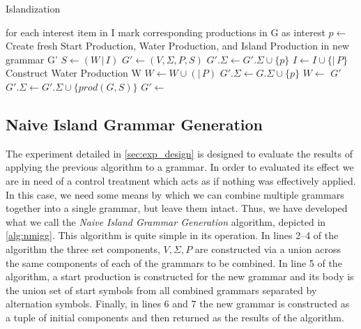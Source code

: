 \documentclass[10pt,nocc]{xrese_report}
\begin{document}
\begin{algorithm}
 \caption{Islandization}
 \begin{algorithmic}[1]
    \LineComment for each interest item in I mark corresponding productions in G as interest
      \State $p \gets$ 
      \State {}
    \EndFor
    \LineComment Create fresh Start Production, Water Production, and Island Production in new grammar G'
    \State $S \gets (W\,|\,I)$
    \State $G' \gets (V,\Sigma,P,S)$
      \State $G'.\Sigma \gets G'.\Sigma \cup \{p\}$
      \State $I \gets I \cup \{|\,P\}$
      \State {}
    \EndFor
    \LineComment Construct Water Production W
      \State $W \gets W \cup (|\,P)$
      \State $G'.\Sigma \gets G.\Sigma \cup \{p\}$
    \EndFor
    \State $W \gets$ 
    \State \Return $G'$
  \EndProcedure
  \Statex
      \State \Return
    \Else
        \State $G'.\Sigma \gets G'.\Sigma \cup \{prod(G,S)\}$
        \State {}
      \EndFor
    \EndIf
  \EndFunction
  \Statex
    \State $G' \gets$ 
    \State {}
  \EndFunction
 \end{algorithmic}

\end{algorithm}

\subsection{Naive Island Grammar Generation}

The experiment detailed in \ref{sec:exp_design} is designed to evaluate the results of applying the previous algorithm to a grammar. In order to evaluated its effect we are in need of a control treatment which acts as if nothing was effectively applied. In this case, we need some means by which we can combine multiple grammars together into a single grammar, but leave them intact. Thus, we have developed what we call the \textit{Naive Island Grammar Generation} algorithm, depicted in \ref{alg:nmigg}. This algorithm is quite simple in its operation. In lines 2--4 of the algorithm the three set components, $V,\Sigma,P$ are constructed via a union across the same components of each of the grammars to be combined. In line 5 of the algorithm, a start production is constructed for the new grammar and its body is the union set of start symbols from all combined grammars separated by alternation symbols. Finally, in lines 6 and 7 the new grammar is constructed as a tuple of initial components and then returned as the results of the algorithm.
\end{document}

